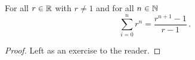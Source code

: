 \guard



\begin{prop}
\label{prop:sumOfGeometricSequence}
  For all $r\in\mathbb{R}$ with $r\not=1$ and for all $n\in\mathbb{N}$
  \[ \sum_{i=0}^n r^n = \frac{r^{n+1}-1}{r-1} \,.\]
\end{prop}
\begin{proof}
  Left as an exercise to the reader.
\end{proof}
